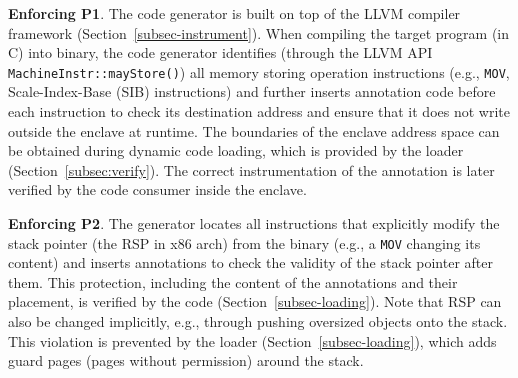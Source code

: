 

\vspace{3pt}\noindent\textbf{Enforcing P1}.  The code generator is built on top of the LLVM compiler framework (Section~\ref{subsec-instrument}). When compiling the target program (in C) into binary, the code generator identifies (through the LLVM API \verb|MachineInstr::mayStore()|) all memory storing operation instructions (e.g., \texttt{MOV}, Scale-Index-Base (SIB) instructions) and further inserts annotation code before each instruction to check its destination address and ensure that it does not write outside the enclave at runtime. 
The boundaries of the enclave address space can be obtained during dynamic code loading, which is provided by the loader (Section~\ref{subsec:verify}). The correct instrumentation of the annotation is later verified by the code consumer inside the enclave. 


\vspace{3pt}\noindent\textbf{Enforcing P2}. 
The generator locates all instructions that explicitly modify the stack pointer (the RSP in x86 arch) from the binary (e.g., a \texttt{MOV} changing its content) and inserts annotations to check the validity of the stack pointer after them. This protection, including the content of the annotations and their placement, is verified by the code \DIFdelbegin {}\DIFdelend \DIFaddbegin {}\DIFaddend (Section~\ref{subsec-loading}). 
Note that RSP can also be changed implicitly, e.g., through pushing oversized objects onto the stack. This violation is prevented by the loader (Section~\ref{subsec-loading}), which adds guard pages (pages without permission) around the stack. 


